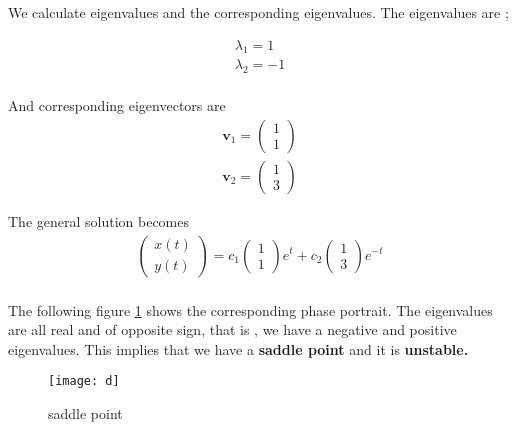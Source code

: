 \documentclass[12pt,a4paper]{article}
\begin{document}
\begin{enumerate}
We calculate eigenvalues and the corresponding eigenvalues.
The eigenvalues are ;

\begin{eqnarray*}
\lambda_1=1\\
\lambda_2=-1\\
\end{eqnarray*}

And corresponding eigenvectors are
\begin{eqnarray*}
\textbf{v}_1=\begin{pmatrix}
1\\
1 
\end{pmatrix}\\
\textbf{v}_2=\begin{pmatrix}
1\\
 3
\end{pmatrix}
\end{eqnarray*}


The general solution becomes
\begin{eqnarray*}
\begin{pmatrix}
x(t) \\
y(t)
\end{pmatrix}=c_1 \begin{pmatrix}
1\\
1
\end{pmatrix}e^t+c_2  \begin{pmatrix}
1\\
3
\end{pmatrix}e^{-t}\\
\end{eqnarray*}

The following figure \ref{fig 4} shows the corresponding phase portrait. The eigenvalues are all real and of opposite sign, that is , we have a negative and positive eigenvalues. This implies that we have a \textbf{saddle point} and it is \textbf{unstable.}

\begin{figure}[H]
\texttt{[image: d]}
\centering
\caption{saddle point}
\label{fig 4}
\end{figure}


\end{enumerate}
\end{document}
